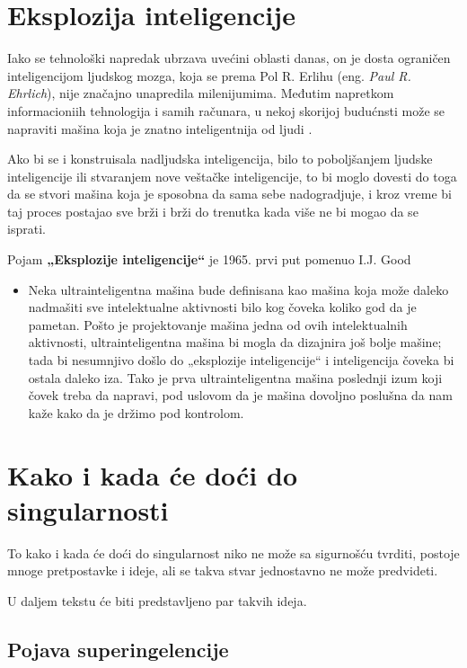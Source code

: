 \documentclass[a4paper]{article}
\begin{document}
\section{Eksplozija inteligencije}
Iako se tehnološki napredak ubrzava uvećini oblasti danas, on je dosta ograničen inteligencijom ljudskog mozga, koja se prema Pol R. Erlihu (eng. \textit{Paul R. Ehrlich}), nije značajno unapredila milenijumima.\cite{ref 1} Međutim napretkom informacioniih tehnologija i samih računara, u nekoj skorijoj budućnsti može se napraviti mašina koja je znatno inteligentnija od ljudi .

Ako bi se i konstruisala nadljudska inteligencija, bilo to poboljšanjem ljudske inteligencije ili stvaranjem nove veštačke inteligencije, to bi moglo dovesti do toga da se stvori mašina koja je sposobna da sama sebe nadogradjuje, i kroz vreme bi taj proces postajao sve brži i brži do trenutka kada više ne bi mogao da se isprati.

Pojam \textbf{„Eksplozije inteligencije“} je 1965. prvi put pomenuo I.J. Good\cite{ref 2}

\begin{itemize}
\item Neka ultrainteligentna mašina bude definisana kao mašina koja može daleko nadmašiti sve intelektualne aktivnosti bilo kog čoveka koliko god da je pametan. Pošto je projektovanje mašina jedna od ovih intelektualnih aktivnosti, ultrainteligentna mašina bi mogla da dizajnira još bolje mašine; tada bi nesumnjivo došlo do „eksplozije inteligencije“ i inteligencija čoveka bi ostala daleko iza. Tako je prva ultrainteligentna mašina poslednji izum koji čovek treba da napravi, pod uslovom da je mašina dovoljno poslušna da nam kaže kako da je držimo pod kontrolom.
\end{itemize} 
\section{Kako i kada će doći do singularnosti}	
\label{sec:kakoikada}
To kako i kada će doći do singularnost niko ne može sa sigurnošću tvrditi, postoje mnoge pretpostavke i ideje, ali se takva stvar jednostavno ne može predvideti.

U daljem tekstu će biti predstavljeno par takvih ideja.
\subsection{Pojava superingelencije}
\end{document}
